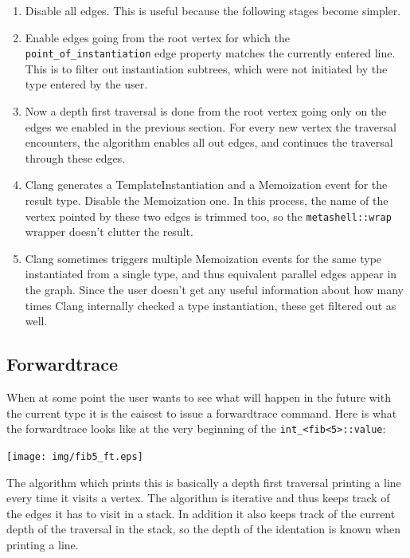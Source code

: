 \begin{enumerate}
    \item
        Disable all edges. This is useful because the following stages become
        simpler.
    \item
        Enable edges going from the root vertex for which the
        \verb|point_of_instantiation| edge property matches the currently
        entered line. This is to filter out instantiation subtrees, which were
        not initiated by the type entered by the user.
    \item
        Now a depth first traversal is done from the root vertex going only on
        the edges we enabled in the previous section. For every new vertex the
        traversal encounters, the algorithm enables all out edges, and
        continues the traversal through these edges.
    \item
        Clang generates a TemplateInstantiation and a Memoization event for the
        result type. Disable the Memoization one. In this process, the name of
        the vertex pointed by these two edges is trimmed too, so the
        \verb|metashell::wrap| wrapper doesn't clutter the result.
    \item
        Clang sometimes triggers multiple Memoization events for the same type
        instantiated from a single type, and thus equivalent parallel edges
        appear in the graph. Since the user doesn't get any useful information
        about how many times Clang internally checked a type instantiation,
        these get filtered out as well.
\end{enumerate}

\subsection{Forwardtrace}

When at some point the user wants to see what will happen in the future with
the current type it is the eaisest to issue a forwardtrace command. Here is
what the forwardtrace looks like at the very beginning of the
\verb|int_<fib<5>::value|:

\bigskip

\texttt{[image: img/fib5\_ft.eps]}

The algorithm which prints this is basically a depth first traversal printing
a line every time it visits a vertex. The algorithm is iterative and thus keeps
track of the edges it has to visit in a stack. In addition it also keeps track
of the current depth of the traversal in the stack, so the depth of the
identation is known when printing a line.

